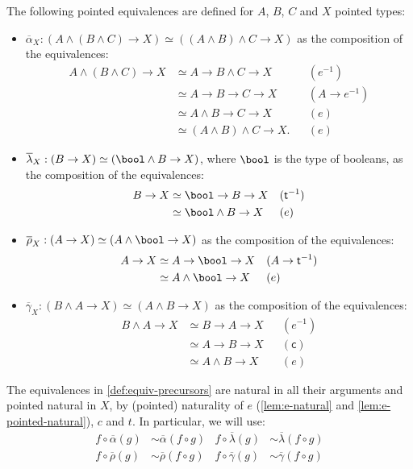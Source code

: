 \documentclass{article}
\newcommand{\smsh}{\wedge}
\renewcommand{\o}{\ensuremath{\circ}}
\newcommand{\sy}{^{-1}}
\newcommand{\alphabar}{\overline{\alpha}}
\newcommand{\rhobar}{\overline{\rho}}
\newcommand{\lambdabar}{\overline{\lambda}}
\newcommand{\gammabar}{\overline{\gamma}}
\newcommand{\two}{\mathsf{t}}
\newcommand{\twist}{\mathsf{c}}
\begin{document}
\begin{defn}\label{def:equiv-precursors}
	The following pointed equivalences are defined for $A$, $B$, $C$ and $X$ pointed types:
	\begin{itemize}
		\item $\alphabar_X : (A \smsh (B \smsh C) \to X) \simeq ((A \smsh B) \smsh C \to X)$ as the composition of the equivalences:
			\begin{align*}
			    A \smsh (B \smsh C)\to X&\simeq A \to B\smsh C\to X && (e\sy)\\
			    &\simeq A \to B\to C\to X && (A \to e\sy)\\
			    &\simeq A \smsh B\to C\to X && (e)\\
		    	&\simeq (A \smsh B)\smsh C\to X. && (e)
			\end{align*}
		\item $\lambdabar_X : (B \to X) \simeq (\bool \smsh B \to X)$, where $\bool$ is the type of booleans, as the composition of the equivalences:
			\begin{align*}
				B \to X &\simeq \bool \to B \to X && (\two\sy)\\
				&\simeq \bool \smsh B \to X && (e)
			\end{align*}
		\item $\rhobar_X : (A \to X) \simeq (A \smsh \bool \to X)$ as the composition of the equivalences:
			\begin{align*}
				A \to X &\simeq A \to \bool \to X && (A \to \two\sy)\\
				&\simeq A \smsh \bool \to X && (e)
			\end{align*}
		\item $\gammabar_X : (B \smsh A \to X) \simeq (A \smsh B \to X)$ as the composition of the equivalences:
			\begin{align*}
				B \smsh A \to X &\simeq B \to A \to X && (e\sy)\\
				&\simeq A \to B \to X && (\twist)\\
				&\simeq A \smsh B \to X && (e)
			\end{align*}
	\end{itemize}
\end{defn}

\begin{rmk}\label{rmk:alrg-pointed-natural}
	The equivalences in \autoref{def:equiv-precursors} are natural in all their arguments and pointed natural in $X$, by (pointed) naturality of $e$ (\autoref{lem:e-natural} and \autoref{lem:e-pointed-natural}), $c$ and $t$. In particular, we will use:
	\begin{align*}
	f \o \alphabar(g) &\sim \alphabar(f \o g) & f \o \lambdabar(g) &\sim \lambdabar(f \o g)\\
	f \o \rhobar(g) &\sim \rhobar(f \o g) & f \o \gammabar(g) &\sim \gammabar(f \o g)
	\end{align*}
\end{rmk}
\end{document}
